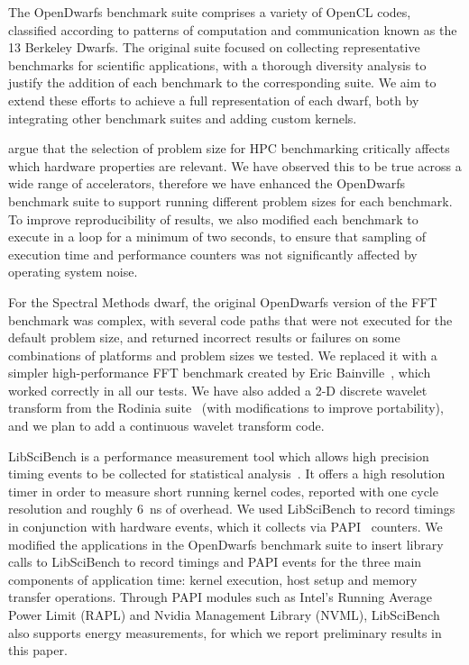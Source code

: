 \documentclass[../document.tex]{subfiles}
\begin{document}
\label{sec:extending_the_opendwarfs_benchmark_suite}

The OpenDwarfs benchmark suite comprises a variety of OpenCL codes, classified according to patterns of computation and communication known as the 13 Berkeley Dwarfs.\cite{asanovic2006landscape}
The original suite focused on collecting representative benchmarks for scientific applications, with a thorough diversity analysis to justify the addition of each benchmark to the corresponding suite.
We aim to extend these efforts to achieve a full representation of each dwarf, both by integrating other benchmark suites and adding custom kernels.

\citet{marjanovic2016hpc} argue that the selection of problem size for HPC benchmarking critically affects which hardware properties are relevant.
We have observed this to be true across a wide range of accelerators, therefore we have enhanced the OpenDwarfs benchmark suite to support running different problem sizes for each benchmark.
To improve reproducibility of results, we also modified each benchmark to execute in a loop for a minimum of two seconds, to ensure that sampling of execution time and performance counters was not significantly affected by operating system noise.

For the Spectral Methods dwarf, the original OpenDwarfs version of the FFT benchmark was complex, with several code paths that were not executed for the default problem size, and returned incorrect results or failures on some combinations of platforms and problem sizes we tested.
We replaced it with a simpler high-performance FFT benchmark created by Eric Bainville~\cite{bainville2010fft}, which worked correctly in all our tests.
We have also added a 2-D discrete wavelet transform from the Rodinia suite~\cite{che2009rodinia} (with modifications to improve portability), and we plan to add a continuous wavelet transform code.

LibSciBench is a performance measurement tool which allows high precision timing events to be collected for statistical analysis~\cite{hoefler2015scientific}.
It offers a high resolution timer in order to measure short running kernel codes, reported with one cycle resolution and roughly \SI{6}{\nano\second} of overhead.
We used LibSciBench to record timings in conjunction with hardware events, which it collects via PAPI~\cite{mucci1999papi} counters.
We modified the applications in the OpenDwarfs benchmark suite to insert library calls to LibSciBench to record timings and PAPI events for the three main components of application time: kernel execution, host setup and memory transfer operations.
Through PAPI modules such as Intel's Running Average Power Limit (RAPL) and Nvidia Management Library (NVML), LibSciBench also supports energy measurements, for which we report preliminary results in this paper.
\end{document}
